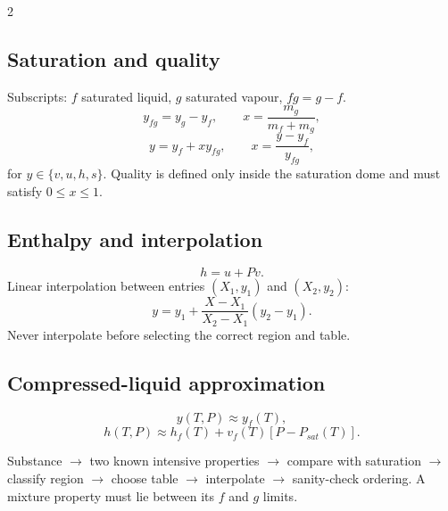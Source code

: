 \documentclass[9pt,a4paper]{extarticle}
\newcommand{\boxeq}[1]{\boxed{\displaystyle #1}}
\begin{document}
\begin{multicols}{2}
\subsection{Saturation and quality}
Subscripts: $f$ saturated liquid, $g$ saturated vapour, $fg=g-f$.
\[
y_{fg}=y_g-y_f,
\qquad x=\frac{m_g}{m_f+m_g},
\]
\[
\boxeq{y=y_f+xy_{fg}},\qquad x=\frac{y-y_f}{y_{fg}},
\]
for $y\in\{v,u,h,s\}$. Quality is defined only inside the saturation dome and must satisfy $0\le x\le1$.

\subsection{Enthalpy and interpolation}
\[
h=u+Pv.
\]
Linear interpolation between entries $(X_1,y_1)$ and $(X_2,y_2)$:
\[
y=y_1+\frac{X-X_1}{X_2-X_1}(y_2-y_1).
\]
Never interpolate before selecting the correct region and table.

\subsection{Compressed-liquid approximation}
\[
y(T,P)\approx y_f(T),
\]
\[
h(T,P)\approx h_f(T)+v_f(T)[P-P_{sat}(T)].
\]

\begin{quick}
Substance $\rightarrow$ two known intensive properties $\rightarrow$ compare with saturation $\rightarrow$ classify region $\rightarrow$ choose table $\rightarrow$ interpolate $\rightarrow$ sanity-check ordering. A mixture property must lie between its $f$ and $g$ limits.
\end{quick}
\end{multicols}
\end{document}
